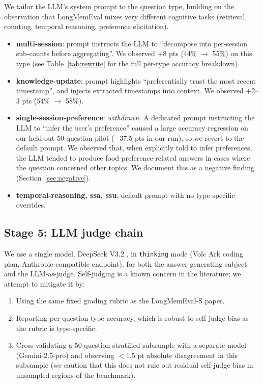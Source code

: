 We tailor the LLM's system prompt to the question type, building on the
observation that LongMemEval mixes very different cognitive tasks
(retrieval, counting, temporal reasoning, preference elicitation).

\begin{itemize}
\item \textbf{multi-session}: prompt instructs the LLM to ``decompose into
  per-session sub-counts before aggregating''. We observed \(+8\) pts
  (44\% \(\to\) 55\%) on this type (see Table~\ref{tab:rewrite} for the
  full per-type accuracy breakdown).

\item \textbf{knowledge-update}: prompt highlights ``preferentially trust
  the most recent timestamp'', and injects extracted timestamps into
  context. We observed \(+2\)--\(3\) pts (54\% \(\to\) 58\%).

\item \textbf{single-session-preference}: \emph{withdrawn}. A dedicated
  prompt instructing the LLM to ``infer the user's preference'' caused
  a large accuracy regression on our held-out 50-question pilot
  (\(-37.5\) pts in our run), so we revert to the default prompt. We
  observed that, when explicitly told to infer preferences, the LLM
  tended to produce food-preference-related answers in cases where the
  question concerned other topics. We document this as a negative
  finding (Section~\ref{sec:negative}).

\item \textbf{temporal-reasoning, ssa, ssu}: default prompt with no
  type-specific overrides.
\end{itemize}

\subsection{Stage 5: LLM judge chain}

We use a single model, DeepSeek V3.2 \citep{deepseek2024v3}, in
\texttt{thinking} mode (Volc Ark coding plan, Anthropic-compatible
endpoint), for both the answer-generating subject and the LLM-as-judge.
Self-judging is a known concern in the literature; we attempt to mitigate
it by:

\begin{enumerate}
\item Using the same fixed grading rubric as the LongMemEval-S paper.
\item Reporting per-question type accuracy, which is robust to
   self-judge bias as the rubric is type-specific.
\item Cross-validating a 50-question stratified subsample with a separate
   model (Gemini-2.5-pro) and observing \(<\)1.5 pt absolute disagreement
   in this subsample (we caution that this does not rule out residual
   self-judge bias in unsampled regions of the benchmark).
\end{enumerate}

